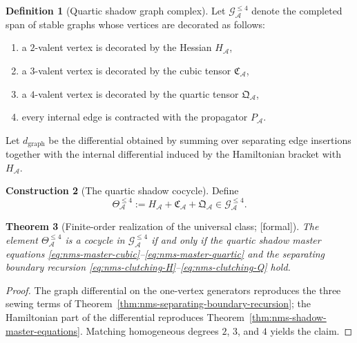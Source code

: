 \documentclass[11pt,oneside]{memoir}
\numberwithin{equation}{chapter}
\newtheorem{theorem}{Theorem}[chapter]
\theoremstyle{definition}
\newtheorem{definition}[theorem]{Definition}
\newtheorem{construction}[theorem]{Construction}
\newcommand{\ClaimStatusProvedHere}{\textnormal{[formal]}}
\newcommand{\cA}{\mathcal A}
\begin{document}
\begin{definition}[Quartic shadow graph complex]
\label{def:nms-shadow-graph-complex}
Let $\mathcal G_{\cA}^{\le 4}$ denote the completed span of stable graphs whose vertices are decorated as follows:
\begin{enumerate}[label=\textup{(\roman*)}]
\item a $2$-valent vertex is decorated by the Hessian $H_{\cA}$,
\item a $3$-valent vertex is decorated by the cubic tensor $\mathfrak C_{\cA}$,
\item a $4$-valent vertex is decorated by the quartic tensor $\mathfrak Q_{\cA}$,
\item every internal edge is contracted with the propagator $P_{\cA}$.
\end{enumerate}
Let $d_{\mathrm{graph}}$ be the differential obtained by summing over separating edge insertions together with the internal differential induced by the Hamiltonian bracket with $H_{\cA}$.
\end{definition}

\begin{construction}[The quartic shadow cocycle]
\label{constr:nms-shadow-cocycle}
Define
\begin{equation}
\label{eq:nms-shadow-cocycle}
\Theta_{\cA}^{\le 4}
:=
H_{\cA}+\mathfrak C_{\cA}+\mathfrak Q_{\cA}
\in \mathcal G_{\cA}^{\le 4}.
\end{equation}
\end{construction}

\begin{theorem}[Finite-order realization of the universal class; \ClaimStatusProvedHere]
\label{thm:nms-shadow-cocycle-characterization}
The element $\Theta_{\cA}^{\le 4}$ is a cocycle in $\mathcal G_{\cA}^{\le 4}$ if and only if the quartic shadow master equations \eqref{eq:nms-master-cubic}--\eqref{eq:nms-master-quartic} and the separating boundary recursion \eqref{eq:nms-clutching-H}--\eqref{eq:nms-clutching-Q} hold.
\end{theorem}

\begin{proof}
The graph differential on the one-vertex generators reproduces the three sewing terms of Theorem~\ref{thm:nms-separating-boundary-recursion}; the Hamiltonian part of the differential reproduces Theorem~\ref{thm:nms-shadow-master-equations}.  Matching homogeneous degrees $2$, $3$, and $4$ yields the claim.\qedhere
\end{proof}
\end{document}
